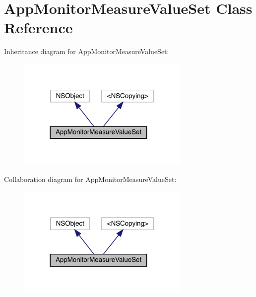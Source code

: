 \hypertarget{interface_app_monitor_measure_value_set}{}\section{App\+Monitor\+Measure\+Value\+Set Class Reference}
\label{interface_app_monitor_measure_value_set}


Inheritance diagram for App\+Monitor\+Measure\+Value\+Set\+:\nopagebreak
\begin{figure}[H]
\begin{center}
\leavevmode
\includegraphics[width=236pt]{interface_app_monitor_measure_value_set__inherit__graph}
\end{center}
\end{figure}


Collaboration diagram for App\+Monitor\+Measure\+Value\+Set\+:\nopagebreak
\begin{figure}[H]
\begin{center}
\leavevmode
\includegraphics[width=236pt]{interface_app_monitor_measure_value_set__coll__graph}
\end{center}
\end{figure}
